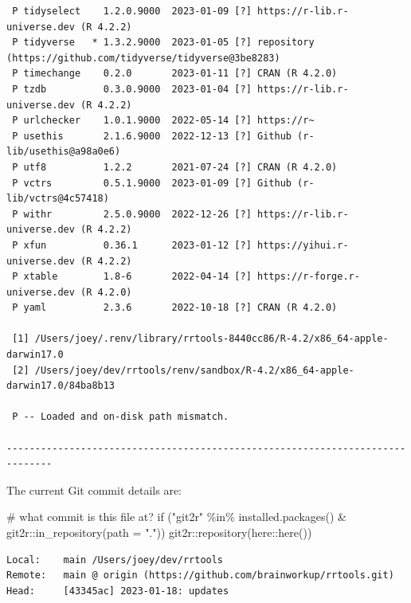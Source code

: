 \documentclass[
  super,
  preprint,
  3p]{elsarticle}
\newenvironment{Shaded}{\begin{snugshade}}{\end{snugshade}}
\newcommand{\AttributeTok}[1]{\textcolor[rgb]{0.40,0.45,0.13}{#1}}
\newcommand{\CommentTok}[1]{\textcolor[rgb]{0.37,0.37,0.37}{#1}}
\newcommand{\ControlFlowTok}[1]{\textcolor[rgb]{0.00,0.23,0.31}{#1}}
\newcommand{\FunctionTok}[1]{\textcolor[rgb]{0.28,0.35,0.67}{#1}}
\newcommand{\NormalTok}[1]{\textcolor[rgb]{0.00,0.23,0.31}{#1}}
\newcommand{\SpecialCharTok}[1]{\textcolor[rgb]{0.37,0.37,0.37}{#1}}
\newcommand{\StringTok}[1]{\textcolor[rgb]{0.13,0.47,0.30}{#1}}
\begin{document}
\begin{verbatim}
 P tidyselect    1.2.0.9000  2023-01-09 [?] https://r-lib.r-universe.dev (R 4.2.2)
 P tidyverse   * 1.3.2.9000  2023-01-05 [?] repository (https://github.com/tidyverse/tidyverse@3be8283)
 P timechange    0.2.0       2023-01-11 [?] CRAN (R 4.2.0)
 P tzdb          0.3.0.9000  2023-01-04 [?] https://r-lib.r-universe.dev (R 4.2.2)
 P urlchecker    1.0.1.9000  2022-05-14 [?] https://r~
 P usethis       2.1.6.9000  2022-12-13 [?] Github (r-lib/usethis@a98a0e6)
 P utf8          1.2.2       2021-07-24 [?] CRAN (R 4.2.0)
 P vctrs         0.5.1.9000  2023-01-09 [?] Github (r-lib/vctrs@4c57418)
 P withr         2.5.0.9000  2022-12-26 [?] https://r-lib.r-universe.dev (R 4.2.2)
 P xfun          0.36.1      2023-01-12 [?] https://yihui.r-universe.dev (R 4.2.2)
 P xtable        1.8-6       2022-04-14 [?] https://r-forge.r-universe.dev (R 4.2.0)
 P yaml          2.3.6       2022-10-18 [?] CRAN (R 4.2.0)

 [1] /Users/joey/.renv/library/rrtools-8440cc86/R-4.2/x86_64-apple-darwin17.0
 [2] /Users/joey/dev/rrtools/renv/sandbox/R-4.2/x86_64-apple-darwin17.0/84ba8b13

 P -- Loaded and on-disk path mismatch.

------------------------------------------------------------------------------
\end{verbatim}

The current Git commit details are:

\begin{Shaded}
\begin{Highlighting}[]
\CommentTok{\# what commit is this file at? }
\ControlFlowTok{if}\NormalTok{ (}\StringTok{"git2r"} \SpecialCharTok{\%in\%} \FunctionTok{installed.packages}\NormalTok{() }\SpecialCharTok{\&}\NormalTok{ git2r}\SpecialCharTok{::}\FunctionTok{in\_repository}\NormalTok{(}\AttributeTok{path =} \StringTok{"."}\NormalTok{)) git2r}\SpecialCharTok{::}\FunctionTok{repository}\NormalTok{(here}\SpecialCharTok{::}\FunctionTok{here}\NormalTok{())  }
\end{Highlighting}
\end{Shaded}

\begin{verbatim}
Local:    main /Users/joey/dev/rrtools
Remote:   main @ origin (https://github.com/brainworkup/rrtools.git)
Head:     [43345ac] 2023-01-18: updates
\end{verbatim}


  
\end{document}
